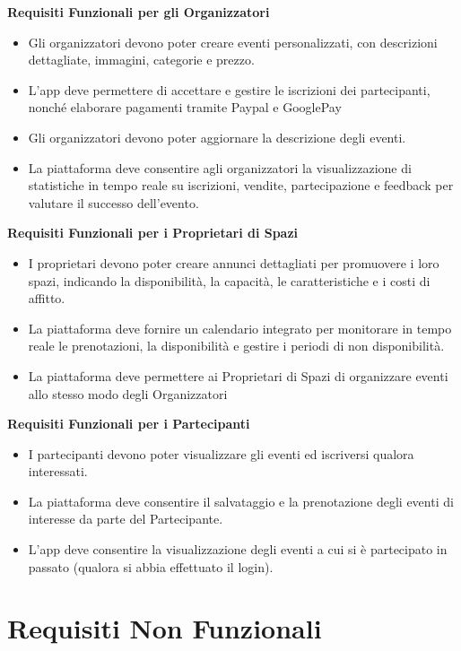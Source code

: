 \documentclass[9pt]{extarticle}
\begin{document}
\textbf{Requisiti Funzionali per gli Organizzatori}
\begin{itemize}
	\item \FR Gli organizzatori devono poter creare eventi personalizzati, con descrizioni dettagliate, immagini, categorie e prezzo.
	\item \FR L’app deve permettere di accettare e gestire le iscrizioni dei partecipanti, nonché elaborare pagamenti tramite Paypal e GooglePay
	\item \FR Gli organizzatori devono poter aggiornare la descrizione degli eventi.
	\item \FR La piattaforma deve consentire agli organizzatori la visualizzazione di statistiche in tempo reale su iscrizioni, vendite, partecipazione e feedback per valutare il successo dell’evento.
\end{itemize}

\textbf{Requisiti Funzionali per i Proprietari di Spazi}
\begin{itemize}
	\item \FR I proprietari devono poter creare annunci dettagliati per promuovere i loro spazi, indicando la disponibilità, la capacità, le caratteristiche e i costi di affitto.
	\item \FR La piattaforma deve fornire un calendario integrato per monitorare in tempo reale le prenotazioni, la disponibilità e gestire i periodi di non disponibilità.
    \item \FR La piattaforma deve permettere ai Proprietari di Spazi di organizzare eventi allo stesso modo degli Organizzatori
\end{itemize}


\textbf{Requisiti Funzionali per i Partecipanti}
\begin{itemize}
	\item \FR I partecipanti devono poter visualizzare gli eventi ed iscriversi qualora interessati.
	\item \FR La piattaforma deve consentire il salvataggio e la prenotazione degli eventi di interesse da parte del Partecipante.
	\item \FR L'app deve consentire la visualizzazione degli eventi a cui si è partecipato in passato (qualora si abbia effettuato il login).
\end{itemize}

\section{Requisiti Non Funzionali}
\end{document}
